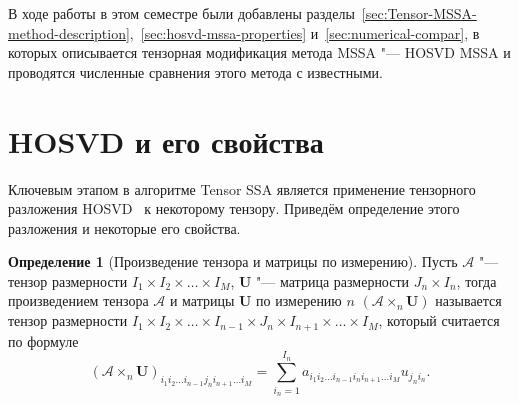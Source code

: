 \documentclass[specialist,
    substylefile = spbu_report.rtx,
    subf,href,colorlinks=true, 12pt]{disser}
\theoremstyle{plain}
\theoremstyle{definition}
\newtheorem{definition}{Определение}[section]
\theoremstyle{remark}
\begin{document}
    В ходе работы в этом семестре были добавлены
    разделы~\ref{sec:Tensor-MSSA-method-description},~\ref{sec:hosvd-mssa-properties} и~\ref{sec:numerical-compar},
    в которых описывается тензорная модификация метода MSSA "--- HOSVD MSSA и проводятся численные сравнения этого метода
    с известными.
    \newpage


    \section{HOSVD и его свойства}\label{sec:hosvd}
    Ключевым этапом в алгоритме Tensor SSA является применение тензорного разложения HOSVD~\cite{hosvd} к некоторому тензору.
    Приведём определение этого разложения и некоторые его свойства.

    \begin{definition}[Произведение тензора и матрицы по измерению]
        Пусть $\mathcal A$ "--- тензор размерности $I_1\times I_2\times\ldots\times I_M$, $\mathbf U$
        "--- матрица размерности $J_n\times I_n$, тогда произведением тензора $\mathcal{A}$ и матрицы $\mathbf{U}$ по
        измерению $n$ $(\mathcal{A}\times_n \mathbf U)$ называется тензор размерности $I_1\times I_2\times\ldots\times I_{n-1}
        \times J_n\times I_{n+1}\times \ldots\times I_M$, который считается по формуле
        \[
            (\mathcal{A}\times_n \mathbf U)_{i_1 i_2\ldots i_{n-1}j_n i_{n+1}\ldots i_M} = \sum_{i_n=1}^{I_n} a_{i_1 i_2\ldots
            i_{n-1}i_n i_{n+1} \ldots i_M} u_{j_n i_n}.
        \]
    \end{definition}
\end{document}
